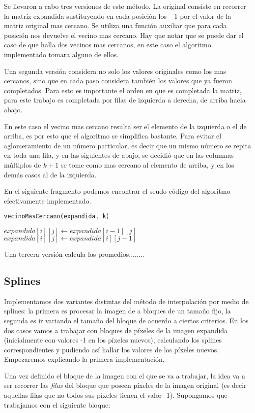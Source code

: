 \documentclass[a4paper]{article}
\newcounter{row}
\newcounter{col}
\begin{document}
Se llevaron a cabo tres versiones de este método. La original consiste en recorrer la matriz expandida sustituyendo en cada posición los $ -1 $ por el valor de la matriz original mas cercano. Se utiliza una función auxiliar que para cada posición nos devuelve el vecino mas cercano. Hay que notar que se puede dar el caso de que halla dos vecinos mas cercanos, en este caso el algoritmo implementado tomara alguno de ellos.

Una segunda versión considera no solo los valores originales como los mas cercanos, sino que en cada paso considera también los valores que ya fueron completados. Para esto es importante el orden en que es completada la matriz, para este trabajo es completada por filas de izquierda a derecha, de arriba hacia abajo.
 
 En este caso el vecino mas cercano resulta ser el elemento de la izquierda o el de arriba, es por esto que el algoritmo se simplifica bastante. Para evitar el aglomeramiento de un número particular, es decir que un mismo número se repita en toda una fila, y en las siguientes de abajo, se decidió que en las columnas múltiplos de $ k +1 $ se tome como mas cercano al elemento de arriba, y en los demás casos al de la izquierda.
 
 
 En el siguiente fragmento podemos encontrar el seudo-código del algoritmo efectivamente implementado.


\begin{algorithm}[H]
    \caption{\texttt{vecinoMasCercano(expandida, k)}}
\begin{algorithmic}[1]
  \For{$i \leftarrow [0:cantidad\_filas) $}
    \For{$j \leftarrow [0:cantidad\_columnas)$}
        		\State $expandida[i][j] \leftarrow expandida[i-1][j]$
          \Else
            \State $expandida[i][j] \leftarrow expandida[i][j-1]$
          \EndIf
       \EndIf
    \EndFor
  \EndFor
\end{algorithmic}
\end{algorithm}

Una tercera versión calcula los promedios........


\subsection{Splines}
Implementamos dos variantes distintas del método de interpolación por medio de splines: la primera es procesar la imagen de a bloques de un tamaño fijo, la segunda es ir variando el tamaño del bloque de acuerdo a ciertos criterios. En los dos casos vamos a trabajar con bloques de píxeles de la imagen expandida (inicialmente con valores -1 en los píxeles nuevos), calculando los splines correspondientes y pudiendo así hallar los valores de los píxeles nuevos. Empezaremos explicando la primera implementación.
\par Una vez definido el bloque de la imagen con el que se va a trabajar, la idea va a ser recorrer las \textit{filas} del bloque que poseen píxeles de la imagen original (es decir aquellas filas que no todos sus píxeles tienen el valor -1). Supongamos que trabajamos con el siguiente bloque:
\end{document}
